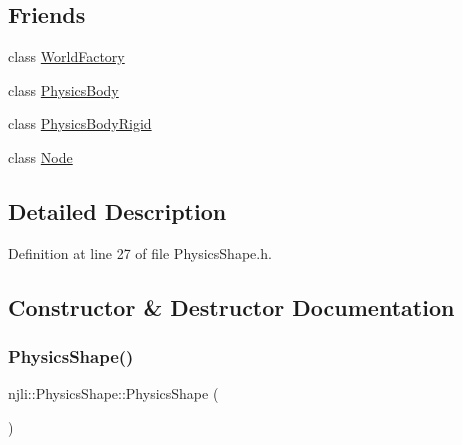 \subsection*{Friends}
\begin{DoxyCompactItemize}
\item 
class \mbox{\hyperlink{classnjli_1_1_physics_shape_acb96ebb09abe8f2a37a915a842babfac}{World\+Factory}}
\item 
class \mbox{\hyperlink{classnjli_1_1_physics_shape_a5602338bf4d8e0e6baa58d3daa8dc90a}{Physics\+Body}}
\item 
class \mbox{\hyperlink{classnjli_1_1_physics_shape_ada345e4f9c2a87f06868b74d30e94ad2}{Physics\+Body\+Rigid}}
\item 
class \mbox{\hyperlink{classnjli_1_1_physics_shape_a6db9d28bd448a131448276ee03de1e6d}{Node}}
\end{DoxyCompactItemize}


\subsection{Detailed Description}


Definition at line 27 of file Physics\+Shape.\+h.



\subsection{Constructor \& Destructor Documentation}
\mbox{\label{classnjli_1_1_physics_shape_a23c941342461cf9b8ea3a00f96e4b166}} 
\subsubsection{\texorpdfstring{Physics\+Shape()}{PhysicsShape()}\hspace{0.1cm}{\footnotesize\ttfamily [1/3]}}
{\footnotesize\ttfamily njli\+::\+Physics\+Shape\+::\+Physics\+Shape (\begin{DoxyParamCaption}{ }\end{DoxyParamCaption})\hspace{0.3cm}{\ttfamily [protected]}}

\mbox{\label{classnjli_1_1_physics_shape_ab15fa64eb27e24f04baa5ba707a9a030}} 
